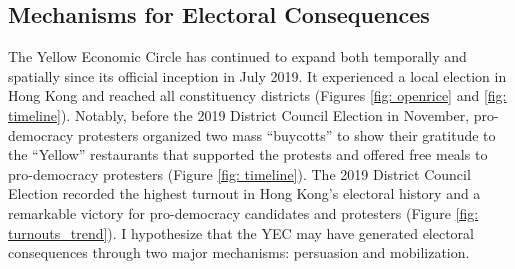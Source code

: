 \documentclass[letterpaper, 12pt]{article}
\begin{document}
\subsection{Mechanisms for Electoral Consequences}
The Yellow Economic Circle has continued to expand both temporally and spatially since its official inception in July 2019. It experienced a local election in Hong Kong and reached all constituency districts (Figures \ref{fig: openrice} and \ref{fig: timeline}). Notably, before the 2019 District Council Election in November, pro-democracy protesters organized two mass ``buycotts'' to show their gratitude to the ``Yellow'' restaurants that supported the protests and offered free meals to pro-democracy protesters (Figure \ref{fig: timeline}). The 2019 District Council Election recorded the highest turnout in Hong Kong's electoral history and a remarkable victory for pro-democracy candidates and protesters (Figure \ref{fig: turnouts_trend}). I hypothesize that the YEC may have generated electoral consequences through two major mechanisms: persuasion and mobilization.
\end{document}
